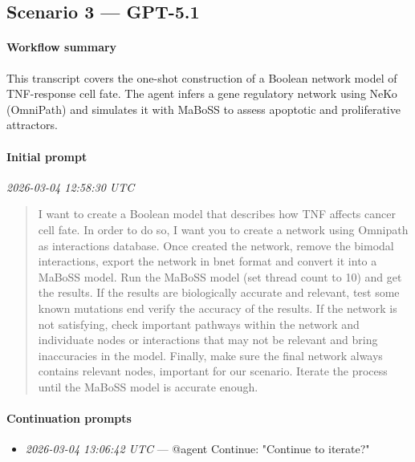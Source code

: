 \subsection{Scenario 3 — GPT-5.1}

\paragraph{Workflow summary}
This transcript covers the one-shot construction of a Boolean network model of TNF-response cell fate. The agent infers a gene regulatory network using NeKo (OmniPath) and simulates it with MaBoSS to assess apoptotic and proliferative attractors.

\paragraph{Initial prompt} \hfill \textit{\small 2026-03-04 12:58:30 UTC}
\begin{quote}
I want to create a Boolean model that describes how TNF affects cancer cell fate. In order to do so, I want you to create a network using Omnipath as interactions database.
Once created the network, remove the bimodal interactions, export the network in bnet format and convert it into a MaBoSS model. Run the MaBoSS model (set thread count to 10) and get the results. If the results are biologically accurate and relevant, test some known mutations end verify the accuracy of the results. If the network is not satisfying, check important pathways within the network and individuate nodes or interactions that may not be relevant and bring inaccuracies in the model. Finally, make sure the final network always contains relevant nodes, important for our scenario.
Iterate the process until the MaBoSS model is accurate enough.
\end{quote}

\paragraph{Continuation prompts}
\begin{itemize}
\item \textit{\small 2026-03-04 13:06:42 UTC} --- @agent Continue: "Continue to iterate?"
\end{itemize}

